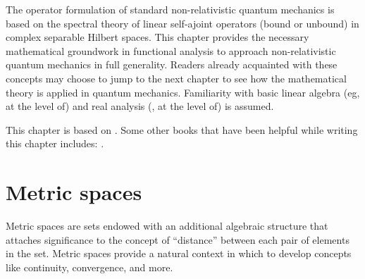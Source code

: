 




\begin{refsection}


The operator formulation of standard non-relativistic quantum mechanics is based on the spectral theory of linear self-ajoint operators (bound or unbound) in complex separable Hilbert spaces.
This chapter provides the necessary mathematical groundwork in functional analysis to approach non-relativistic quantum mechanics in full generality. 
Readers already acquainted with these concepts may choose to jump to the next chapter to see how the mathematical theory is applied in quantum mechanics. 
  Familiarity with basic linear algebra (eg, at the level of) and real analysis (\eg, at the level of) is assumed. 


This chapter is based on \textcite{Reed.Simon:1980}. 
Some other books that have been helpful while writing this chapter includes:
\textcite{Teschl:2009,Berberian:1976,Hutson.Pym:1980,Debnath.Mikusinski:2005,Helmberg:1969}.


  \section{Metric spaces}

Metric spaces are sets endowed with an additional algebraic structure that attaches significance to the concept of ``distance'' between each pair of elements in the set.
Metric spaces provide a natural context in which to develop concepts like continuity, convergence, and more.


\end{refsection}
